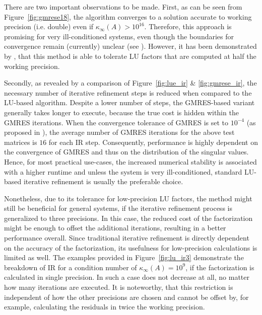 There are two important observations to be made. First, as can be seen from Figure~\hyperref[fig:gmrese18]{\ref{fig:gmrese18}}, the algorithm converges to a solution accurate to working precision (i.e. double) even if $\kappa_\infty(A) > 10^{16}$. Therefore, this approach is promising for very ill-conditioned systems, even though the boundaries for convergence remain (currently) unclear (see \cite{carson_new_2017}). However, it has been demonstrated by \cite{carson_accelerating_2018}, that this method is able to tolerate LU factors that are computed at half the working precision. 

Secondly, as revealed by a comparison of Figure~\hyperref[fig:lue_ir]{\ref{fig:lue_ir}} \& \hyperref[fig:gmrese_ir]{\ref{fig:gmrese_ir}}, the necessary number of iterative refinement steps is reduced when compared to the LU-based algorithm. Despite a lower number of steps, the GMRES-based variant generally takes longer to execute, because the true cost is hidden within the GMRES iterations. When the convergence tolerance of GMRES is set to $10^{-4}$ (as proposed in \cite{carson_new_2017}), the average number of GMRES iterations for the above test matrices is $16$ for each IR step. Consequently, performance is highly dependent on the convergence of GMRES and thus on the distribution of the singular values. Hence, for most practical use-cases, the increased numerical stability is associated with a higher runtime and unless the system is very ill-conditioned, standard LU-based iterative refinement is usually the preferable choice.

Nonetheless, due to its tolerance for low-precision LU factors, the method might still be beneficial for general systems, if the iterative refinement process is generalized to three precisions. In this case, the reduced cost of the factorization might be enough to offset the additional iterations, resulting in a better performance overall. Since traditional iterative refinement is directly dependent on the accuracy of the factorization, its usefulness for low-precision calculations is limited as well. The examples provided in Figure~\hyperref[fig:lu_ir3]{\ref{fig:lu_ir3}} demonstrate the breakdown of IR for a condition number of $\kappa_\infty (A)=10^9$, if the factorization is calculated in single precision. In such a case does not decrease at all, no matter how many iterations are executed.
It is noteworthy, that this restriction is independent of how the other precisions are chosen and cannot be offset by, for example, calculating the residuals in twice the working precision.

